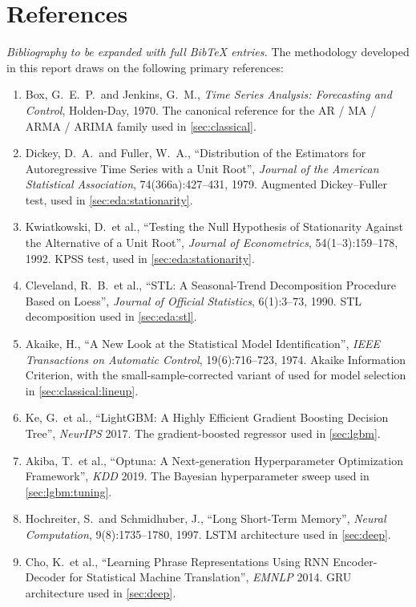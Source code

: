 \section{References}
\label{sec:references}

\textit{Bibliography to be expanded with full BibTeX entries.} The methodology developed in this report draws on the following primary references:

\begin{enumerate}
  \item Box, G.~E.~P.\ and Jenkins, G.~M., \emph{Time Series Analysis: Forecasting and Control}, Holden-Day, 1970. The canonical reference for the AR / MA / ARMA / ARIMA family used in \cref{sec:classical}.
  \item Dickey, D.~A.\ and Fuller, W.~A., ``Distribution of the Estimators for Autoregressive Time Series with a Unit Root'', \emph{Journal of the American Statistical Association}, 74(366a):427--431, 1979. Augmented Dickey--Fuller test, used in \cref{sec:eda:stationarity}.
  \item Kwiatkowski, D.\ et al., ``Testing the Null Hypothesis of Stationarity Against the Alternative of a Unit Root'', \emph{Journal of Econometrics}, 54(1--3):159--178, 1992. KPSS test, used in \cref{sec:eda:stationarity}.
  \item Cleveland, R.~B.\ et al., ``STL: A Seasonal-Trend Decomposition Procedure Based on Loess'', \emph{Journal of Official Statistics}, 6(1):3--73, 1990. STL decomposition used in \cref{sec:eda:stl}.
  \item Akaike, H., ``A New Look at the Statistical Model Identification'', \emph{IEEE Transactions on Automatic Control}, 19(6):716--723, 1974. Akaike Information Criterion, with the small-sample-corrected variant of \cite{burnham_anderson} used for model selection in \cref{sec:classical:lineup}.
  \item Ke, G.\ et al., ``LightGBM: A Highly Efficient Gradient Boosting Decision Tree'', \emph{NeurIPS} 2017. The gradient-boosted regressor used in \cref{sec:lgbm}.
  \item Akiba, T.\ et al., ``Optuna: A Next-generation Hyperparameter Optimization Framework'', \emph{KDD} 2019. The Bayesian hyperparameter sweep used in \cref{sec:lgbm:tuning}.
  \item Hochreiter, S.\ and Schmidhuber, J., ``Long Short-Term Memory'', \emph{Neural Computation}, 9(8):1735--1780, 1997. LSTM architecture used in \cref{sec:deep}.
  \item Cho, K.\ et al., ``Learning Phrase Representations Using RNN Encoder-Decoder for Statistical Machine Translation'', \emph{EMNLP} 2014. GRU architecture used in \cref{sec:deep}.

\end{enumerate}
